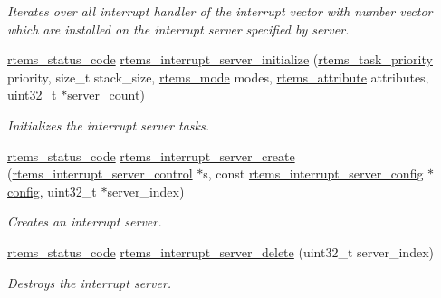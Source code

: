 \begin{DoxyCompactItemize}
\begin{DoxyCompactList}\small\item\em Iterates over all interrupt handler of the interrupt vector with number {\itshape vector} which are installed on the interrupt server specified by {\itshape server}. \end{DoxyCompactList}\item 
\mbox{\hyperlink{group__ClassicStatus_ga545d41846817eaba6143d52ee4d9e9fe}{rtems\+\_\+status\+\_\+code}} \mbox{\hyperlink{group__rtems__interrupt__extension_ga7e728143679eb46d7c4792ea401a4335}{rtems\+\_\+interrupt\+\_\+server\+\_\+initialize}} (\mbox{\hyperlink{group__ClassicTasks_gaa80a0c0938307d1e99d0eb5fee765b47}{rtems\+\_\+task\+\_\+priority}} priority, size\+\_\+t stack\+\_\+size, \mbox{\hyperlink{group__ClassicModes_ga8d46a41a837840dc97336fdcd20e4f68}{rtems\+\_\+mode}} modes, \mbox{\hyperlink{group__ClassicAttributes_gaea40313cf78ed843e09c4315d0a10f79}{rtems\+\_\+attribute}} attributes, uint32\+\_\+t $\ast$server\+\_\+count)
\begin{DoxyCompactList}\small\item\em Initializes the interrupt server tasks. \end{DoxyCompactList}\item 
\mbox{\hyperlink{group__ClassicStatus_ga545d41846817eaba6143d52ee4d9e9fe}{rtems\+\_\+status\+\_\+code}} \mbox{\hyperlink{group__rtems__interrupt__extension_gad7725dd729bfd34f36c0de4d9c326abc}{rtems\+\_\+interrupt\+\_\+server\+\_\+create}} (\mbox{\hyperlink{structrtems__interrupt__server__control}{rtems\+\_\+interrupt\+\_\+server\+\_\+control}} $\ast$s, const \mbox{\hyperlink{structrtems__interrupt__server__config}{rtems\+\_\+interrupt\+\_\+server\+\_\+config}} $\ast$\mbox{\hyperlink{structconfig__s}{config}}, uint32\+\_\+t $\ast$server\+\_\+index)
\begin{DoxyCompactList}\small\item\em Creates an interrupt server. \end{DoxyCompactList}\item 
\mbox{\hyperlink{group__ClassicStatus_ga545d41846817eaba6143d52ee4d9e9fe}{rtems\+\_\+status\+\_\+code}} \mbox{\hyperlink{group__rtems__interrupt__extension_gaa1093bab07e2fe4be3ea1025ea5d15a7}{rtems\+\_\+interrupt\+\_\+server\+\_\+delete}} (uint32\+\_\+t server\+\_\+index)
\begin{DoxyCompactList}\small\item\em Destroys the interrupt server. \end{DoxyCompactList}\item 

\end{DoxyCompactItemize}
